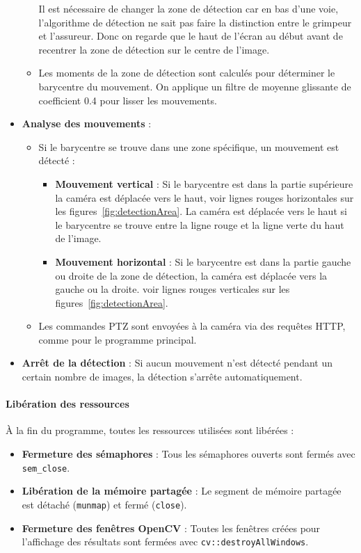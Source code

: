 \documentclass[a4paper, 11pt, french]{article}
\begin{document}
\begin{itemize}
\begin{itemize}
        Il est nécessaire de changer la zone de détection car en bas d'une voie, l'algorithme de détection ne sait pas faire la distinction entre le grimpeur et l'assureur. Donc on regarde que le haut de l'écran au début avant de recentrer la zone de détection sur le centre de l'image.

        \item Les moments de la zone de détection sont calculés pour déterminer le barycentre du mouvement. On applique un filtre de moyenne glissante de coefficient 0.4 pour lisser les mouvements.
    \end{itemize}

    \item \textbf{Analyse des mouvements} :
    \begin{itemize}
        \item Si le barycentre se trouve dans une zone spécifique, un mouvement est détecté :
        \begin{itemize}
            \item \textbf{Mouvement vertical} : Si le barycentre est dans la partie supérieure la caméra est déplacée vers le haut, voir lignes rouges horizontales sur les figures~\ref{fig:detectionArea}. La caméra est déplacée vers le haut si le barycentre se trouve entre la ligne rouge et la ligne verte du haut de l'image.
            \item \textbf{Mouvement horizontal} : Si le barycentre est dans la partie gauche ou droite de la zone de détection, la caméra est déplacée vers la gauche ou la droite. voir lignes rouges verticales sur les figures~\ref{fig:detectionArea}.
        \end{itemize}
        \item Les commandes PTZ sont envoyées à la caméra via des requêtes HTTP, comme pour le programme principal.
    \end{itemize}
    \item \textbf{Arrêt de la détection} : Si aucun mouvement n'est détecté pendant un certain nombre de images, la détection s'arrête automatiquement.
\end{itemize}


\paragraph{Libération des ressources}
À la fin du programme, toutes les ressources utilisées sont libérées :
\begin{itemize}
    \item \textbf{Fermeture des sémaphores} : Tous les sémaphores ouverts sont fermés avec \texttt{sem\_close}.
    \item \textbf{Libération de la mémoire partagée} : Le segment de mémoire partagée est détaché (\texttt{munmap}) et fermé (\texttt{close}).
    \item \textbf{Fermeture des fenêtres OpenCV} : Toutes les fenêtres créées pour l'affichage des résultats sont fermées avec \texttt{cv::destroyAllWindows}.
\end{itemize}
\end{document}
